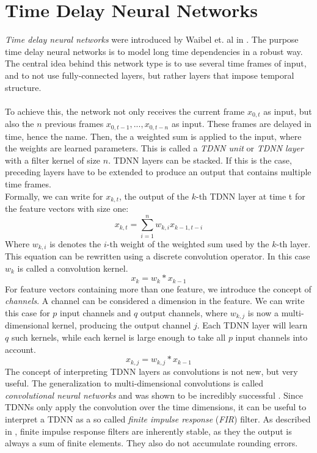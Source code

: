 
\section{Time Delay Neural Networks}

\textit{Time delay neural networks} were introduced by Waibel et. al in \cite{waibel1990phoneme}. The purpose time delay neural networks is to model long time dependencies in a robust way. The central idea behind this network type is to use several time frames of input, and to not use fully-connected layers, but rather layers that impose temporal structure. \\ \\
To achieve this, the network not only receives the current frame $x_{0,t}$ as input, but also the $n$ previous frames $x_{0,t - 1}, ..., x_{0,t - n}$ as input. These frames are delayed in time, hence the name. Then, the a weighted sum is applied to the input, where the weights are learned parameters. This is called a \textit{TDNN unit} or \textit{TDNN layer} with a filter kernel of size $n$. TDNN layers can be stacked. If this is the case, preceding layers have to be extended to produce an output that contains multiple time frames. \\
Formally, we can write for $x_{k,t}$, the output of the $k$-th TDNN layer at time t for the feature vectors with size one:
\[
x_{k,t} = \sum_{i = 1}^n w_{k, i} x_{k - 1, t - i}
\]
Where $w_{k, i}$ is denotes the $i$-th weight of the weighted sum used by the $k$-th layer. \\
This equation can be rewritten using a discrete convolution operator. In this case $w_k$ is called a convolution kernel. 
\[
x_{k} = w_{k} * x_{k - 1}
\]
For feature vectors containing more than one feature, we introduce the concept of \textit{channels}. A channel can be considered a dimension in the feature. We can write this case for $p$ input channels and $q$ output channels, where $w_{k, j}$ is now a multi-dimensional kernel, producing the output channel $j$. Each TDNN layer will learn $q$ such kernels, while each kernel is large enough to take all $p$ input channels into account. 
\[
x_{k,j} = w_{k, j} * x_{k - 1}
\]
The concept of interpreting TDNN layers as convolutions is not new, but very useful. The generalization to multi-dimensional convolutions is called \textit{convolutional neural networks} and was shown to be incredibly successful \cite{krizhevsky2012imagenet}. Since TDNNs only apply the convolution over the time dimensions, it can be useful to interpret a TDNN as a so called \textit{finite impulse response} (\textit{FIR}) filter. As described in \cite{leon2015signale}, finite impulse response filters are inherently stable, as they the output is always a sum of finite elements. They also do not accumulate rounding errors. \\
